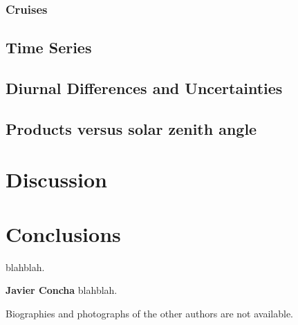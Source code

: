 \documentclass[12pt,draft]{spieman}  %
\begin{document}
\begin{spacing}{2}
\subsubsection{Cruises}

\subsection{Time Series}

\subsection{Diurnal Differences and Uncertainties}

\subsection{Products versus solar zenith angle}


\section{Discussion}

\section{Conclusions}


\acknowledgments 
blahblah.  




\vspace{2ex}\noindent\textbf{Javier Concha} blahblah.

\vspace{1ex}
\noindent Biographies and photographs of the other authors are not available.

\listoffigures
\listoftables

\end{spacing}
\end{document}
